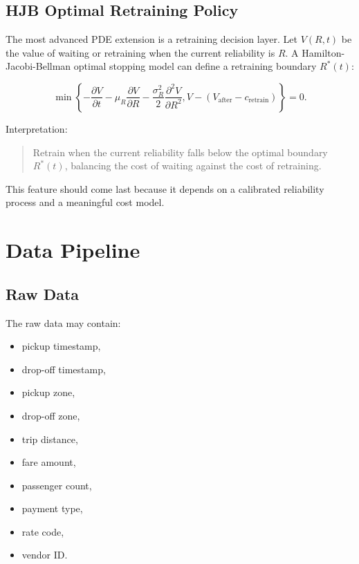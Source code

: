 \documentclass[11pt]{article}
\begin{document}
\subsection{HJB Optimal Retraining Policy}

The most advanced PDE extension is a retraining decision layer. Let $V(R,t)$ be the value of waiting or retraining when the current reliability is $R$. A Hamilton-Jacobi-Bellman optimal stopping model can define a retraining boundary $R^*(t)$:

\[
    \min\left\{
    -\frac{\partial V}{\partial t}
    - \mu_R \frac{\partial V}{\partial R}
    - \frac{\sigma_R^2}{2}\frac{\partial^2 V}{\partial R^2},
    V - (V_{\mathrm{after}} - c_{\mathrm{retrain}})
    \right\} = 0.
\]

Interpretation:

\begin{quote}
    Retrain when the current reliability falls below the optimal boundary $R^*(t)$, balancing the cost of waiting against the cost of retraining.
\end{quote}

This feature should come last because it depends on a calibrated reliability process and a meaningful cost model.

\section{Data Pipeline}

\subsection{Raw Data}

The raw data may contain:

\begin{itemize}
    \item pickup timestamp,
    \item drop-off timestamp,
    \item pickup zone,
    \item drop-off zone,
    \item trip distance,
    \item fare amount,
    \item passenger count,
    \item payment type,
    \item rate code,
    \item vendor ID.
\end{itemize}
\end{document}
